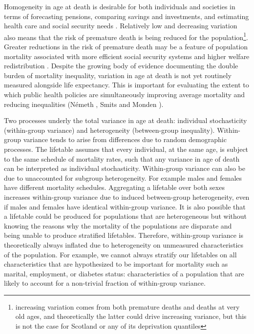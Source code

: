 \documentclass[12pt,oneside,a4paper]{article} %
\theoremstyle{definition}
\begin{document}
Homogeneity in age at death is desirable for both individuals and societies in terms of forecasting pensions, comparing savings and investments, and estimating health care and social security needs \citep{Raalte2011}. Relatively low and decreasing variation also
means that the risk of premature death is being reduced for the population\footnote{increasing variation comes from both
premature deaths and deaths at very old ages, and theoretically the latter could
drive increasing variance, but this is not the case for Scotland or any of its
deprivation quantiles}. Greater reductions in the risk of premature death may be a feature of population mortality associated with more efficient social security systems and higher welfare redistribution 
\citep{Raalte2012,Bambra2011,Popham2013}. Despite the growing body of evidence documenting the double burden of mortality inequality, variation in age at death is not yet routinely measured alongside life expectancy. This is important for evaluating the extent to which public health policies are simultaneously improving average mortality and reducing inequalities (N\'emeth \citeyear{Nemeth2017}, Smits and Monden \citeyear{Smits2009}).
  
Two processes underly the total variance in age at death: individual
stochasticity (within-group variance) and heterogeneity (between-group
inequality). Within-group variance tends to arise from differences due to random
demographic processes. The lifetable assumes that every individual, at the same age, is subject
to the same schedule of mortality rates, such that any
variance in age of death can be interpreted as individual stochasticity.
Within-group variance can also be due to unaccounted for subgroup heterogeneity.
For example males and females have different mortality schedules. Aggregating
a lifetable over both sexes increases within-group variance due to induced
between-group heterogeneity, even if males and females have identical
within-group variance. It is also possible that a lifetable could be produced for populations that are
heterogeneous but without knowing the reasons why the mortality of the populations are disparate and being unable to produce stratified lifetables. Therefore, within-group variance is theoretically always inflated
due to heterogeneity on unmeasured characteristics of the population. For
example, we cannot always stratify our lifetables on all characteristics that are hypothesized to be important for mortality such as marital, employment, or diabetes status: characteristics of a population that are likely to account for a
non-trivial fraction of within-group variance.
\end{document}
